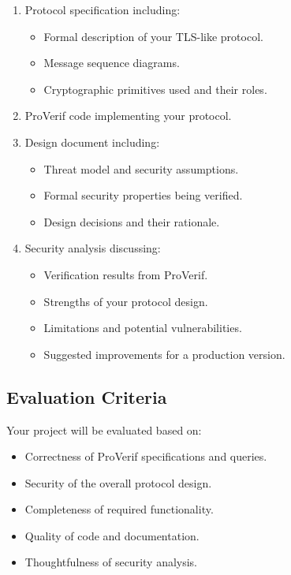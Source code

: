 \documentclass[10pt,a4paper,american]{article}
\begin{document}
\begin{enumerate}
	\item Protocol specification including:
	      \begin{itemize}
		      \item Formal description of your TLS-like protocol.
		      \item Message sequence diagrams.
		      \item Cryptographic primitives used and their roles.
	      \end{itemize}
	\item ProVerif code implementing your protocol.
	\item Design document including:
	      \begin{itemize}
		      \item Threat model and security assumptions.
		      \item Formal security properties being verified.
		      \item Design decisions and their rationale.
	      \end{itemize}
	\item Security analysis discussing:
	      \begin{itemize}
		      \item Verification results from ProVerif.
		      \item Strengths of your protocol design.
		      \item Limitations and potential vulnerabilities.
		      \item Suggested improvements for a production version.
	      \end{itemize}
\end{enumerate}

\subsection*{Evaluation Criteria}
Your project will be evaluated based on:

\begin{itemize}
	\item Correctness of ProVerif specifications and queries.
	\item Security of the overall protocol design.
	\item Completeness of required functionality.
	\item Quality of code and documentation.
	\item Thoughtfulness of security analysis.
\end{itemize}
\end{document}
